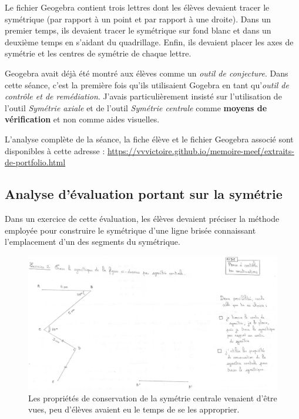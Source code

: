 Le fichier Geogebra contient trois lettres dont les élèves devaient tracer le symétrique (par rapport à un point et par rapport à une droite). Dans un premier temps, ils devaient tracer le symétrique sur fond blanc et dans un deuxième temps en s'aidant du quadrillage. Enfin, ils devaient placer les axes de symétrie et les centres de symétrie de chaque lettre.

Geogebra avait déjà été montré aux élèves comme un \textit{outil de conjecture}. Dans cette séance, c'est la première fois qu'ils utilisaient Gogebra en tant qu'\textit{outil de contrôle et de remédiation}. J'avais particulièrement insisté sur l'utilisation de l'outil \textit{Symétrie axiale} et de l'outil \textit{Symétrie centrale} comme \textbf{moyens de vérification} et non comme aides visuelles. 

L'analyse complète de la séance, la fiche élève et le fichier Geogebra associé sont disponibles à cette adresse : \url{https://vvvictoire.github.io/memoire-meef/extraits-de-portfolio.html}

\subsection{Analyse d'évaluation portant sur la symétrie}\label{annexe:symetrie-eval}

Dans un exercice de cette évaluation, les élèves devaient préciser la méthode employée pour construire le symétrique d'une ligne brisée connaissant l'emplacement d'un des segments du symétrique.

\begin{figure}[h!]
    \centering
    \includegraphics[width=\linewidth]{img/page1-exo2.png}
    \caption{Les propriétés de conservation de la symétrie centrale venaient d'être vues, peu d'élèves avaient eu le temps de se les approprier.}
    \label{fig:xav-eval}
\end{figure}

